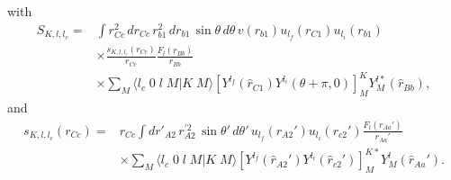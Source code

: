 with
\begin{equation}\label{eq139}
 \begin{split}
S_{K,l,l_c}=&\int r_{Cc}^2 \, d r_{Cc}\,r_{b1}^2\, d r_{b1} \,\sin\theta\, d\theta \, v(r_{b1}) u_{l_f}(r_{C1})u_{l_i}(r_{b1})\\
& \times \frac{s_{K,l,l_c}(r_{Cc})}{r_{Cc}}\frac{F_l(r_{Bb})}{r_{Bb}}\\
&\times\sum_M \langle l_c \;0\;l\;M|K\;M\rangle \left[ Y ^{l_f} (\hat r_{C1}) Y ^{l_i} (\theta+\pi,0) \right] _{M}^{K}
 Y^{l*}_M (\hat r_{Bb}),
 \end{split}
\end{equation}
and
\begin{equation}\label{eq140}
 \begin{split}
s_{K,l,l_c}(r_{Cc})=&r_{Cc}\int  d r'_{A2}\, r_{A2}^{'2}\,\sin\theta'\, d\theta' \, u_{l_f}(r_{A2}')u_{l_i}(r_{c2}') \frac{F_l(r_{Aa}')}{r_{Aa}'} \\
&\times\sum_M \langle l_c \;0\;l\;M|K\;M\rangle \left[ Y ^{l_f} (\hat r_{A2}') Y ^{l_i} (\hat r_{c2}') \right] _{M}^{K*}
 Y^{l}_M (\hat r_{Aa}').
 \end{split}
\end{equation}
